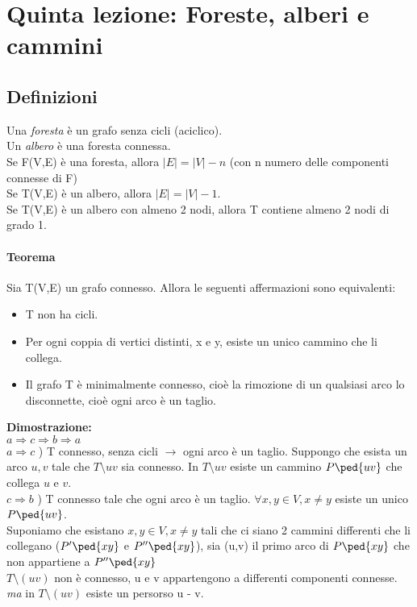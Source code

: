 \section{Quinta lezione: Foreste, alberi e cammini}
\subsection{Definizioni}
Una \emph{foresta} è un grafo senza cicli (aciclico). \\
Un \emph{albero} è una foresta connessa. \\

\noindent
Se F(V,E) è una foresta, allora \(|E| = |V|-n\) (con n numero delle componenti connesse di F) \\
Se T(V,E) è un albero, allora \(|E| = |V|-1\). \\

\noindent
Se T(V,E) è un albero con almeno 2 nodi, allora T contiene almeno 2 nodi di grado 1. 
\paragraph{Teorema} Sia T(V,E) un grafo connesso. Allora le seguenti affermazioni sono equivalenti:
\begin{itemize}
\item T non ha cicli.
\item Per ogni coppia di vertici distinti, x e y, esiste un unico cammino che li collega.
\item Il grafo T è minimalmente connesso, cioè la rimozione di un qualsiasi arco lo disconnette,
cioè ogni arco è un taglio.
\end{itemize}
\textbf{Dimostrazione:} \\
\(a \Rightarrow c \Rightarrow b \Rightarrow a \) \\

\(a \Rightarrow c\) ) T connesso, senza cicli $\rightarrow$ ogni arco è un taglio. Suppongo che esista un arco $u,v$ tale che $T \setminus uv$ sia connesso. In $T \setminus uv$ esiste un cammino $P\ped{uv}$ che collega $u$ e $v$.\\

$c \Rightarrow b$ ) T connesso tale che ogni arco è un taglio. \(\forall x, y \in V , x \neq y\) esiste un unico $P\ped{uv}$. \\
Suponiamo che esistano $x, y \in V, x \neq y$ tali che ci siano 2 cammini differenti che li collegano ($P' \ped{xy}$ e $P''\ped{xy}$), sia (u,v) il primo arco di $P\ped{xy}$ che non appartiene a $P''\ped{xy}$ \\
$T \setminus (uv)$ non è connesso, u e v appartengono a differenti componenti connesse. \emph{ma} in $T \setminus (uv)$ esiste un persorso u - v. \\


